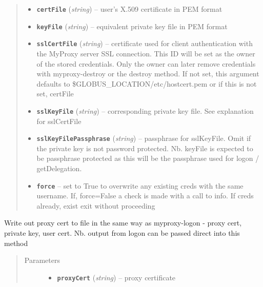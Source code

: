 \documentclass[letterpaper,10pt,english]{sphinxmanual}
\begin{document}
\begin{fulllineitems}
\begin{fulllineitems}
\begin{quote}
\begin{description}
\begin{itemize}
\item {} 
\textbf{\texttt{certFile}} (\emph{string}) -- user's X.509 certificate in PEM format

\item {} 
\textbf{\texttt{keyFile}} (\emph{string}) -- equivalent private key file in PEM format

\item {} 
\textbf{\texttt{sslCertFile}} (\emph{string}) -- certificate used for client authentication with the MyProxy server SSL connection.  This ID will be set as the owner of the stored credentials.  Only the owner can later remove credentials with myproxy-destroy or the destroy method.  If not set, this argument defaults to \$GLOBUS\_LOCATION/etc/hostcert.pem or if this is not set, certFile

\item {} 
\textbf{\texttt{sslKeyFile}} (\emph{string}) -- corresponding private key file.  See explanation for sslCertFile

\item {} 
\textbf{\texttt{sslKeyFilePassphrase}} (\emph{string}) -- passphrase for sslKeyFile.  Omit if the private key is not password protected.  Nb. keyFile is expected to be passphrase protected as this will be the passphrase used for logon / getDelegation.

\item {} 
\textbf{\texttt{force}} -- set to True to overwrite any existing creds with the same username.  If, force=False a check is made with a call to info. If creds already, exist exit without proceeding

\end{itemize}

\end{description}\end{quote}

\end{fulllineitems}


\begin{fulllineitems}
\label{client:myproxy.client.MyProxyClient.writeProxyFile}
Write out proxy cert to file in the same way as myproxy-logon - 
proxy cert, private key, user cert.  Nb. output from logon can be
passed direct into this method
\begin{quote}\begin{description}
\item[{Parameters}] \leavevmode\begin{itemize}
\item {} 
\textbf{\texttt{proxyCert}} (\emph{string}) -- proxy certificate


\end{itemize}
\end{description}
\end{quote}
\end{fulllineitems}
\end{fulllineitems}
\end{document}

